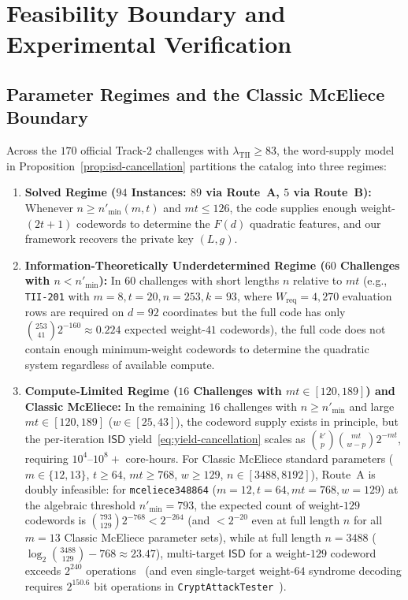 \documentclass[11pt,a4paper]{article}
\theoremstyle{definition}
\theoremstyle{remark}
\newcommand{\ISD}{\mathsf{ISD}}
\begin{document}
\section{Feasibility Boundary and Experimental Verification}
\label{sec:experiments}

\subsection{Parameter Regimes and the Classic McEliece Boundary}
Across the $170$ official Track-2 challenges with $\lambda_{\text{TII}} \ge 83$, the word-supply model in Proposition~\ref{prop:isd-cancellation} partitions the catalog into three regimes:
\begin{enumerate}[leftmargin=2em]
    \item \textbf{Solved Regime ($94$ Instances: $89$ via Route~A, $5$ via Route~B):}
    Whenever $n \ge n'_{\min}(m, t)$ and $mt \le 126$, the code supplies enough weight-$(2t+1)$ codewords to determine the $F(d)$ quadratic features, and our framework recovers the private key $(L, g)$.
    \item \textbf{Information-Theoretically Underdetermined Regime ($60$ Challenges with $n < n'_{\min}$):}
    In $60$ challenges with short lengths $n$ relative to $mt$ (e.g., \texttt{TII-201} with $m = 8, t = 20, n = 253, k = 93$, where $W_{\text{req}} = 4{,}270$ evaluation rows are required on $d = 92$ coordinates but the full code has only $\binom{253}{41} 2^{-160} \approx 0.224$ expected weight-$41$ codewords), the full code does not contain enough minimum-weight codewords to determine the quadratic system regardless of available compute.
    \item \textbf{Compute-Limited Regime ($16$ Challenges with $mt \in [120, 189]$) and Classic McEliece:}
    In the remaining $16$ challenges with $n \ge n'_{\min}$ and large $mt \in [120, 189]$ ($w \in [25, 43]$), the codeword supply exists in principle, but the per-iteration $\ISD$ yield~\eqref{eq:yield-cancellation} scales as $\binom{k'}{p}\binom{mt}{w-p} 2^{-mt}$, requiring $10^4\text{--}10^8+$ core-hours. For Classic McEliece standard parameters ($m \in \{12, 13\}$, $t \ge 64$, $mt \ge 768$, $w \ge 129$, $n \in [3488, 8192]$), Route~A is doubly infeasible: for \texttt{mceliece348864} ($m = 12, t = 64, mt = 768, w = 129$) at the algebraic threshold $n'_{\min} = 793$, the expected count of weight-$129$ codewords is $\binom{793}{129} 2^{-768} < 2^{-264}$ (and $< 2^{-20}$ even at full length $n$ for all $m = 13$ Classic McEliece parameter sets), while at full length $n = 3488$ ($\log_2\binom{3488}{129} - 768 \approx 23.47$), multi-target $\ISD$ for a weight-$129$ codeword exceeds $2^{240}$ operations~\cite{CC98,BJMM12} (and even single-target weight-$64$ syndrome decoding requires $2^{150.6}$ bit operations in \texttt{CryptAttackTester}~\cite{BC24}).
\end{enumerate}
\end{document}
